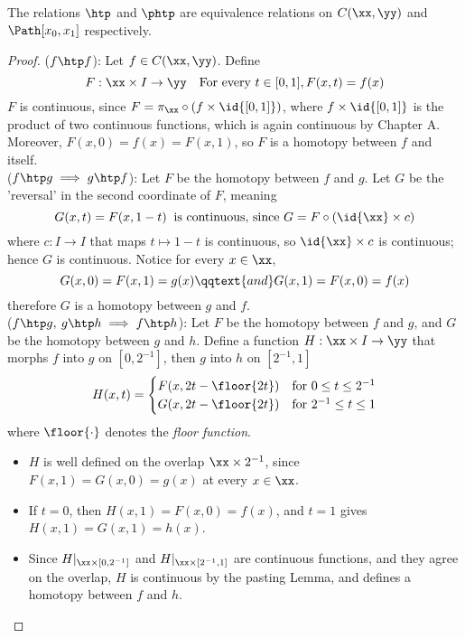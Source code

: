 \documentclass[../main-v2-manifolds.tex]{subfiles}
\begin{document}
\begin{wts}\label{munkres:lemma-51.1}
    The relations $\htp$ and $\phtp$ are equivalence relations on $C(\xx,\yy)$ and $\Path[x_0,x_1]$ respectively.
\end{wts}
\begin{proof}
    ($f\htp f$): Let $f\in C(\xx, \yy)$. Define 
    \[
        F:\xx\times I\to \yy\quad \text{For every } t\in [0,1], F(x,t)=f(x)
    \]
    $F$ is continuous, since $F = \pi_{\xx}\circ (f\times \id{[0,1]})$, where $f\times \id{[0,1]}$ is the product of two continuous functions, which is again continuous by Chapter A. Moreover, $F(x,0)=f(x)=F(x,1)$, so $F$ is a homotopy between $f$ and itself.\\

    ($f\htp g\implies g\htp f$): Let $F$ be the homotopy between $f$ and $g$. Let $G$ be the 'reversal' in the second coordinate of $F$, meaning
    \[
        G(x,t)= F(x,1-t)\:\text{ is continuous, since } G = F\circ (\id{\xx}\times c)
    \]
    where $c:I\to I$ that maps $t\mapsto 1-t$ is continuous, so $\id{\xx}\times c$ is continuous; hence $G$ is continuous. Notice for every $x\in\xx$,
    \[
        G(x,0)=F(x,1)=g(x)\qqtext{and}G(x,1)=F(x,0)=f(x)
    \]
    therefore $G$ is a homotopy between $g$ and $f$. \\

    ($f\htp g,\: g\htp h\implies f\htp h$): Let $F$ be the homotopy between $f$ and $g$, and $G$ be the homotopy between $g$ and $h$. Define a function $H: \xx\times I\to \yy$ that morphs $f$ into $g$ on $[0,2^{-1}]$, then $g$ into $h$ on $[2^{-1},1]$
    \begin{equation}\label{munkres:lemma-51.1-product}
        H(x,t) = \begin{cases}
            F(x,2t-\floor{2t}) & \text{for } 0\leq t\leq 2^{-1}\\
            G(x,2t-\floor{2t}) & \text{for } 2^{-1}\leq t\leq 1\\
        \end{cases}
    \end{equation}
    where $\floor{\cdot}$ denotes the \emph{floor function}. 
    \begin{itemize}
        \item $H$ is well defined on the overlap $\xx\times 2^{-1}$, since $F(x,1)=G(x,0)=g(x)$ at every $x\in\xx$. 
        \item If $t=0$, then $H(x,1)=F(x,0)=f(x)$, and $t=1$ gives $H(x,1)=G(x,1)=h(x)$.
        \item Since $H|_{\xx\times [0,2^{-1}]}$ and $H|_{\xx\times[2^{-1},1]}$ are continuous functions, and they agree on the overlap, $H$ is continuous by the pasting Lemma, and defines a homotopy between $f$ and $h$.
    \end{itemize}



\end{proof}
\end{document}
